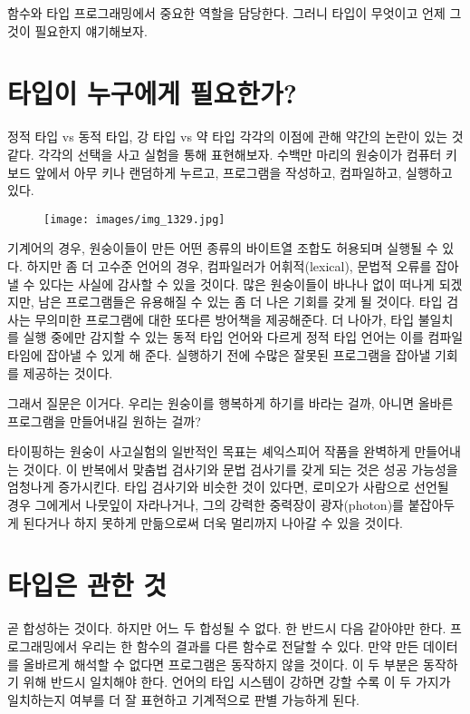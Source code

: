 
\lettrine[lhang=0.17]{함}{수}와 타입 \trCategory\는  프로그래밍에서 중요한 역할을 담당한다. 그러니 타입이 무엇이고 언제 그것이 필요한지 얘기해보자.

\section{타입이 누구에게 필요한가?}

정적 타입 vs 동적 타입, 강 타입 vs 약 타입 각각의 이점에 관해 약간의 논란이 있는 것 같다.
각각의 선택을 사고 실험을 통해 표현해보자. 수백만 마리의 원숭이가 컴퓨터 키보드 앞에서 아무 키나 랜덤하게 누르고, 프로그램을 작성하고, 컴파일하고, 실행하고 있다.

\begin{figure}[H]
\centering
\texttt{[image: images/img\_1329.jpg]}
\end{figure}

\noindent
기계어의 경우, 원숭이들이 만든 어떤 종류의 바이트열 조합도 허용되며 실행될 수 있다.
하지만 좀 더 고수준 언어의 경우, 컴파일러가 어휘적(lexical), 문법적 오류를 잡아낼 수 있다는 사실에 감사할 수 있을 것이다.
많은 원숭이들이 바나나 없이 떠나게 되겠지만, 남은 프로그램들은 유용해질 수 있는 좀 더 나은 기회를 갖게 될 것이다.
타입 검사는 무의미한 프로그램에 대한 또다른 방어책을 제공해준다.
더 나아가, 타입 불일치를 실행 중에만 감지할 수 있는 동적 타입 언어와 다르게 정적 타입 언어는 이를 컴파일 타임에 잡아낼 수 있게 해 준다.
실행하기 전에 수많은 잘못된 프로그램을 잡아낼 기회를 제공하는 것이다.

그래서 질문은 이거다. 우리는 원숭이를 행복하게 하기를 바라는 걸까, 아니면 올바른 프로그램을 만들어내길 원하는 걸까?

타이핑하는 원숭이 사고실험의 일반적인 목표는 셰익스피어 작품을 완벽하게 만들어내는 것이다.
이 반복에서 맞춤법 검사기와 문법 검사기를 갖게 되는 것은 성공 가능성을 엄청나게 증가시킨다.
타입 검사기와 비슷한 것이 있다면, 로미오가 사람으로 선언될 경우 그에게서 나뭇잎이 자라나거나, 그의 강력한 중력장이 광자(photon)를 붙잡아두게 된다거나 하지 못하게 만듦으로써 더욱 멀리까지 나아갈 수 있을 것이다.

\section{타입은  관한 것}

\trCategoryTheory{} 곧 \trArrow\를 합성하는 것이다. 하지만 어느 두  합성될 수 없다. 
한  \trTargetObject\는 반드시 다음  \trSourceObject\와 같아야만 한다.
프로그래밍에서 우리는 한 함수의 결과를 다른 함수로 전달할 수 있다.
만약 \trTargetFunction\이  만든 데이터를 올바르게 해석할 수 없다면 프로그램은 동작하지 않을 것이다.
이 두 부분은 \trComposition\이 동작하기 위해 반드시 일치해야 한다.
언어의 타입 시스템이 강하면 강할 수록 이 두 가지가 일치하는지 여부를 더 잘 표현하고 기계적으로 판별 가능하게 된다.

